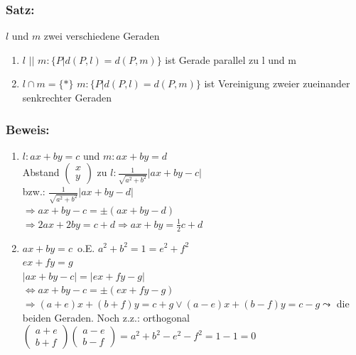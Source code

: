 \subsubsection{Satz:}
$l$ und $m$ zwei verschiedene Geraden
\begin{enumerate}
	\item $l$ $||$ $m: \{P|d(P,l)=d(P,m)\}$ ist Gerade parallel zu l und m 
	\item $l \cap m=\{*\}$ $m: \{P|d(P,l)=d(P,m)\}$ ist Vereinigung zweier zueinander 
	senkrechter Geraden
\end{enumerate}
%
%
%
\subsubsection{Beweis:}
\begin{enumerate}
	\item $l:ax+by=c $ und $  m:ax+by=d$\\
	Abstand $\begin{pmatrix} x \\ y\end{pmatrix}$ zu $l: \frac{1}{\sqrt{a^{2}+b^{2}}} |
	ax+by-c|$\\
	bzw.: $\frac{1}{\sqrt{a^{2}+b^{2}}}|ax+by-d|$\\
	$\Rightarrow ax+by-c=\pm(ax+by-d)$\\
	$\Rightarrow 2ax+2by=c+d \Rightarrow ax+by=\frac{1}{2} c+d$
	\item $ax+by=c \,$ o.E. $a^{2}+b^{2}=1=e^{2}+f^{2}$\\
	$ex+fy=g$\\
	$|ax+by-c|=|ex+fy-g|$\\
	$\Leftrightarrow ax+by-c=\pm(ex+fy-g)$\\
	$\Rightarrow (a+e)x+(b+f)y=c+g \vee (a-e)x+(b-f)y=c-g \leadsto$ die beiden 
	Geraden. Noch z.z.: orthogonal\\
	$\begin{pmatrix} a+e \\ b+f \end{pmatrix} \begin{pmatrix} a-e \\ b-f \end{pmatrix} = 
	a^{2}+b^{2}-e^{2}-f^{2}=1-1=0$
\end{enumerate}